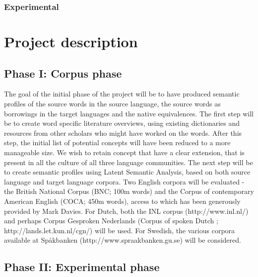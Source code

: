 \documentclass[a4paper]{article}
\begin{document}
\subsubsection{Experimental}











\section{Project description}



\subsection{Phase I: Corpus phase}
The goal of the initial phase of the project will be to have produced semantic profiles of the source words in the source language, the source words as borrowings in the target languages and the native equivalences. 
The first step will be to create word specific literature overviews, using existing dictionaries and resources from other scholars who might have worked on the words.
After this step, the initial list of potential concepts will have been reduced to a more manageable size. We wish to retain concept that have a clear extension, that is present in all the culture of all three language communities.
The next step will be to create semantic profiles using Latent Semantic Analysis, based on both source language and target language corpora. Two English corpora will be evaluated - the British National Corpus (BNC; 100m words) and the Corpus of contemporary American English (COCA; 450m words), access to which has been generously provided by Mark Davies. For Dutch, both the INL corpus (http://www.inl.nl/) and perhaps Corpus Gesproken Nederlands (Corpus of spoken Dutch ; http://lands.let.kun.nl/cgn/) will be used. For Swedish, the various corpora available at Spåkbanken (http://www.spraakbanken.gu.se) will be considered.



\subsection{Phase II: Experimental phase}
\end{document}
